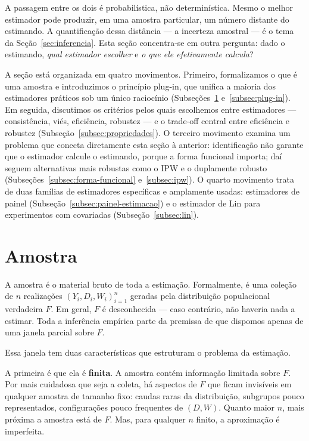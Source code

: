 A passagem entre os dois é probabilística, não determinística. Mesmo o melhor estimador pode produzir, em uma amostra particular, um número distante do estimando. A quantificação dessa distância --- a incerteza amostral --- é o tema da Seção~\ref{sec:inferencia}. Esta seção concentra-se em outra pergunta: dado o estimando, \textit{qual estimador escolher} e \textit{o que ele efetivamente calcula}?

A seção está organizada em quatro movimentos. Primeiro, formalizamos o que é uma amostra e introduzimos o princípio plug-in, que unifica a maioria dos estimadores práticos sob um único raciocínio (Subseções~\ref{subsec:amostra} e~\ref{subsec:plug-in}). Em seguida, discutimos os critérios pelos quais escolhemos entre estimadores --- consistência, viés, eficiência, robustez --- e o trade-off central entre eficiência e robustez (Subseção~\ref{subsec:propriedades}). O terceiro movimento examina um problema que conecta diretamente esta seção à anterior: identificação não garante que o estimador calcule o estimando, porque a forma funcional importa; daí seguem alternativas mais robustas como o IPW e o duplamente robusto (Subseções~\ref{subsec:forma-funcional} e~\ref{subsec:ipw}). O quarto movimento trata de duas famílias de estimadores específicas e amplamente usadas: estimadores de painel (Subseção~\ref{subsec:painel-estimacao}) e o estimador de Lin para experimentos com covariadas (Subseção~\ref{subsec:lin}).

\section{Amostra}
\label{subsec:amostra}

A amostra é o material bruto de toda a estimação. Formalmente, é uma coleção de $n$ realizações $(Y_i, D_i, W_i)_{i=1}^n$ geradas pela distribuição populacional verdadeira $F$. Em geral, $F$ é desconhecida --- caso contrário, não haveria nada a estimar. Toda a inferência empírica parte da premissa de que dispomos apenas de uma janela parcial sobre $F$.

Essa janela tem duas características que estruturam o problema da estimação.

A primeira é que ela é \textbf{finita}. A amostra contém informação limitada sobre $F$. Por mais cuidadosa que seja a coleta, há aspectos de $F$ que ficam invisíveis em qualquer amostra de tamanho fixo: caudas raras da distribuição, subgrupos pouco representados, configurações pouco frequentes de $(D, W)$. Quanto maior $n$, mais próxima a amostra está de $F$. Mas, para qualquer $n$ finito, a aproximação é imperfeita.

